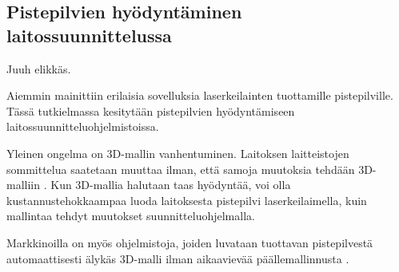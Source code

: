 \subsection{Pistepilvien hyödyntäminen laitossuunnittelussa}
Juuh elikkäs\cite{cadmatic}.

Aiemmin mainittiin erilaisia sovelluksia laserkeilainten tuottamille pistepilville. Tässä tutkielmassa kesitytään pistepilvien hyödyntämiseen laitossuunnitteluohjelmistoissa.

Yleinen ongelma on 3D-mallin vanhentuminen. Laitoksen laitteistojen sommittelua saatetaan muuttaa ilman, että samoja muutoksia tehdään 3D-malliin \cite{Piipponen}. Kun 3D-mallia halutaan taas hyödyntää, voi olla kustannustehokkaampaa luoda laitoksesta pistepilvi laserkeilaimella, kuin mallintaa tehdyt muutokset suunnitteluohjelmalla.


Markkinoilla on myös ohjelmistoja, joiden luvataan tuottavan pistepilvestä automaattisesti älykäs 3D-malli ilman aikaavievää päällemallinnusta \cite{aveva}.

